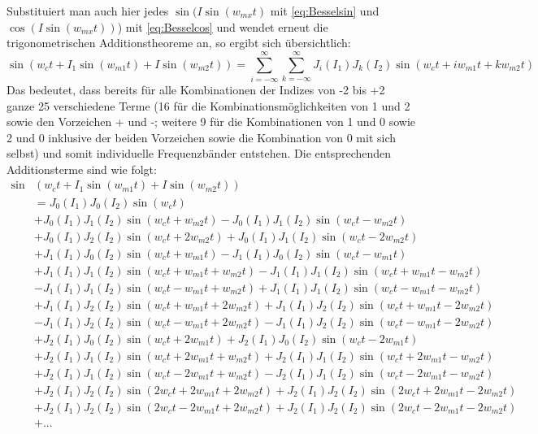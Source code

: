 Substituiert man auch hier jedes \begin{math} \sin(I\sin(w_{mx}t) \end{math} mit \ref{eq:Besselsin} und \begin{math} \cos(I\sin(w_{mx}t)) \end{math}) mit \ref{eq:Besselcos} und wendet erneut die trigonometrischen Additionstheoreme an, so ergibt sich übersichtlich:
\begin{equation}\label{eq:ParallelKompakt}
\sin(w_ct + I_1\sin(w_{m1}t) + I\sin(w_{m2}t)) = \sum_{i=-\infty}^{\infty}\sum_{k=-\infty}^{\infty}J_i(I_1)J_k(I_2)\sin(w_ct + iw_{m1}t + kw_{m2}t)
\end{equation}
Das bedeutet, dass bereits für alle Kombinationen der Indizes von -2 bis +2 ganze 25 verschiedene Terme (16 für die Kombinationsmöglichkeiten von 1 und 2 sowie den Vorzeichen + und -; weitere 9 für die Kombinationen von 1 und 0 sowie 2 und 0 inklusive der beiden Vorzeichen sowie die Kombination von 0 mit sich selbst) und somit individuelle Frequenzbänder entstehen. Die entsprechenden Additionsterme sind wie folgt:
\begin{equation}\label{eq:wallofequations}
\begin{split}
\sin&(w_ct + I_1\sin(w_{m1}t) + I\sin(w_{m2}t)) \\
&= J_0(I_1)J_0(I_2)\sin(w_ct) \\
&+ J_0(I_1)J_1(I_2)\sin(w_ct + w_{m2}t) - J_0(I_1)J_1(I_2)\sin(w_ct - w_{m2}t) \\
&+ J_0(I_1)J_2(I_2)\sin(w_ct + 2w_{m2}t) + J_0(I_1)J_1(I_2)\sin(w_ct - 2w_{m2}t) \\
&+ J_1(I_1)J_0(I_2)\sin(w_ct + w_{m1}t) - J_1(I_1)J_0(I_2)\sin(w_ct - w_{m1}t) \\
&+ J_1(I_1)J_1(I_2)\sin(w_ct + w_{m1}t + w_{m2}t) - J_1(I_1)J_1(I_2)\sin(w_ct + w_{m1}t - w_{m2}t) \\
&- J_1(I_1)J_1(I_2)\sin(w_ct - w_{m1}t + w_{m2}t) + J_1(I_1)J_1(I_2)\sin(w_ct - w_{m1}t - w_{m2}t) \\
&+ J_1(I_1)J_2(I_2)\sin(w_ct + w_{m1}t + 2w_{m2}t) + J_1(I_1)J_2(I_2)\sin(w_ct + w_{m1}t - 2w_{m2}t) \\
&- J_1(I_1)J_2(I_2)\sin(w_ct - w_{m1}t + 2w_{m2}t) - J_1(I_1)J_2(I_2)\sin(w_ct - w_{m1}t - 2w_{m2}t) \\
&+ J_2(I_1)J_0(I_2)\sin(w_ct + 2w_{m1}t) + J_2(I_1)J_0(I_2)\sin(w_ct - 2w_{m1}t) \\
&+ J_2(I_1)J_1(I_2)\sin(w_ct + 2w_{m1}t + w_{m2}t) + J_2(I_1)J_1(I_2)\sin(w_ct + 2w_{m1}t - w_{m2}t) \\
&+ J_2(I_1)J_1(I_2)\sin(w_ct - 2w_{m1}t + w_{m2}t) - J_2(I_1)J_1(I_2)\sin(w_ct - 2w_{m1}t - w_{m2}t) \\
&+ J_2(I_1)J_2(I_2)\sin(2w_ct + 2w_{m1}t + 2w_{m2}t) + J_2(I_1)J_2(I_2)\sin(2w_ct + 2w_{m1}t - 2w_{m2}t) \\
&+ J_2(I_1)J_2(I_2)\sin(2w_ct - 2w_{m1}t + 2w_{m2}t) + J_2(I_1)J_2(I_2)\sin(2w_ct - 2w_{m1}t - 2w_{m2}t) \\
&+ ... 
\end{split}
\end{equation}
